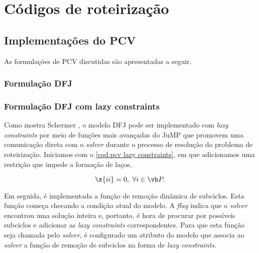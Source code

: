 \section{Códigos de roteirização}\label{sec:códigos}

\subsection{Implementações do PCV}\label{sec:PCV implementações}

As formulações de PCV discutidas são apresentadas a seguir.

\subsubsection{Formulação DFJ}


\subsubsection{Formulação DFJ com lazy constraints}
Como mostra Schermer \cite{SCHERMER:23}, o modelo DFJ pode ser implementado com \emph{lazy constraints} por meio de funções mais avançadas do JuMP que promovem uma comunicação direta com o \emph{solver} durante o processo de resolução do problema de roteirização. Iniciamos com o \cref{cod:pcv lazy constraints}, em que adicionamos uma restrição que impede a formação de laços,

\begin{equation}
    \x{ii} = 0,\ \forall i \in \vb P.
\end{equation}

Em seguida, é implementada a função de remoção dinâmica de subciclos. Esta função começa checando a condição atual do modelo. A \emph{flag}  indica que o \emph{solver} encontrou uma solução inteira e, portanto, é hora de procurar por possíveis subciclos e adicionar as \emph{lazy constraints} correspondentes. Para que esta função seja chamada pelo \emph{solver}, é configurado um atributo do modelo que associa ao \emph{solver} a função de remoção de subciclos na forma de \emph{lazy constraints}.


